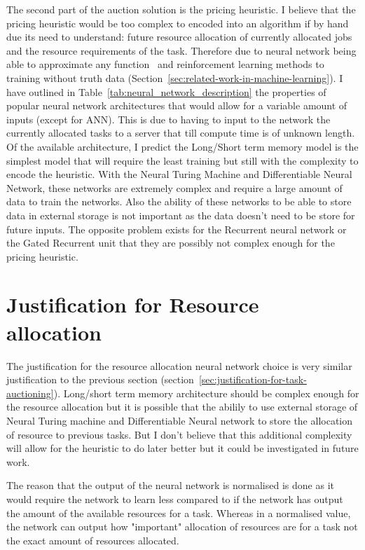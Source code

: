 The second part of the auction solution is the pricing heuristic. I believe that the pricing heuristic would be too complex to encoded into
an algorithm if by hand due its need to understand: future resource allocation of currently allocated jobs and the resource requirements
of the task. Therefore due to neural network being able to approximate any function~\citep{csaji2001approximation} and reinforcement learning
methods to training without truth data (Section~\ref{sec:related-work-in-machine-learning}). I have outlined in Table~\ref{tab:neural_network_description} the properties of popular neural
network architectures that would allow for a variable amount of inputs (except for ANN). This is due to having to input to the network
the currently allocated tasks to a server that till compute time is of unknown length. Of the available architecture, I predict the
Long/Short term memory model is the simplest model that will require the least training but still with the complexity to encode the
heuristic. With the Neural Turing Machine and Differentiable Neural Network, these networks are extremely complex and require a large amount
of data to train the networks. Also the ability of these networks to be able to store data in external storage is not important as the data
doesn't need to be store for future inputs. The opposite problem exists for the Recurrent neural network or the Gated Recurrent unit that
they are possibly not complex enough for the pricing heuristic.

\section{Justification for Resource allocation}\label{sec:justification-for-resource-allocation}
The justification for the resource allocation neural network choice is very similar justification to the previous section
(section~\ref{sec:justification-for-task-auctioning}). Long/short term memory architecture should be complex enough for the resource allocation
but it is possible that the abilily to use external storage of Neural Turing machine and Differentiable Neural network to store the
allocation of resource to previous tasks. But I don't believe that this additional complexity will allow for the heuristic to do
later better but it could be investigated in future work.

The reason that the output of the neural network is normalised is done as it would require the network to learn less compared
to if the network has output the amount of the available resources for a task. Whereas in a normalised value, the network can
output how "important" allocation of resources are for a task not the exact amount of resources allocated.